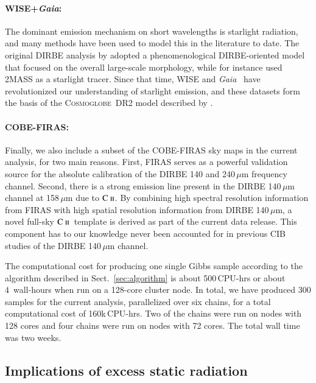 \documentclass{aa}
\def\Gaia{\textit{Gaia}}
\newcommand{\cii}{\ensuremath{\mathsc {C\ ii}}}
\newcommand{\mathsc}[1]{{\normalfont\textsc{#1}}}
\newcommand{\cosmoglobe}{\textsc{Cosmoglobe}}
\begin{document}
  \paragraph{WISE+\textit{Gaia}:} The dominant emission mechanism on short
  wavelengths is starlight radiation, and many methods have been used
  to model this in the literature to date. The original DIRBE analysis
  by \citet{arendt1998} adopted a phenomenological DIRBE-oriented
  model that focused on the overall large-scale morphology, while for
  instance \citet{wright:2001} used 2MASS as a starlight tracer. Since
  that time, WISE \citep{wright:2010} and \Gaia\ \citep{gaia:2016} have revolutionized our understanding of
  starlight emission, and these datasets form the basis of the
  \cosmoglobe\ DR2 model described by \citet{CG02_04}.

  \paragraph{COBE-FIRAS:} Finally, we also include a subset of the
  COBE-FIRAS \citep{mather:1994} sky maps in the current analysis, for two main
  reasons. First, FIRAS serves as a powerful validation source for
  the absolute calibration of the DIRBE 140 and 240\,$\mu\mathrm{m}$
  frequency channel. Second, there is a
  strong emission line present in the DIRBE 140\,$\mu\mathrm{m}$
  channel at 158$\,\mu\mathrm{m}$ due to \cii. By combining high
  spectral resolution information from FIRAS with high spatial
  resolution information from DIRBE 140\,$\mu\mathrm{m}$, a novel
  full-sky \cii\ template is derived as part of the current data
  release. This component has to our knowledge never been accounted
  for in previous CIB studies of the DIRBE 140\,$\mu\mathrm{m}$ channel.

The computational cost for producing one single Gibbs sample according
to the algorithm described in Sect.~\ref{sec:algorithm} is about
500\,CPU-hrs or about 4~wall-hours when run on a 128-core cluster
node. In total, we have produced 300 samples for the current analysis,
parallelized over six chains, for a total computational cost of
160k\,CPU-hrs. Two of the chains were run on nodes with 128 cores and
four chains were run on nodes with 72 cores. The total wall time was
two weeks.


\subsection{Implications of excess static radiation}
\label{sec:excessrad}
\end{document}
